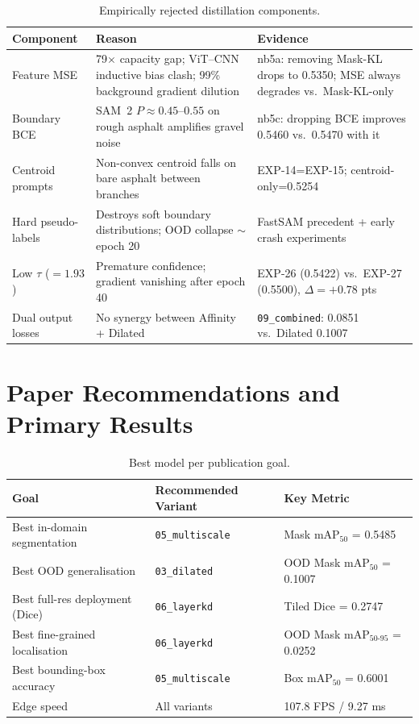 \documentclass[12pt,a4paper]{article}
\begin{document}
\begin{table}[H]\centering
\caption{Empirically rejected distillation components.}
\label{tab:rejected}
\begin{tabular}{p{2.8cm}p{5.8cm}p{4.8cm}}
\toprule
Component & Reason & Evidence \\
\midrule
Feature MSE &
  79$\times$ capacity gap; ViT--CNN inductive bias clash;
  99\% background gradient dilution &
  nb5a: removing Mask-KL drops to 0.5350;
  MSE always degrades vs.\ Mask-KL-only \\
\midrule
Boundary BCE &
  SAM~2 $P\approx0.45$--$0.55$ on rough asphalt amplifies gravel noise &
  nb5c: dropping BCE improves 0.5460 vs.\ 0.5470 with it \\
\midrule
Centroid prompts &
  Non-convex centroid falls on bare asphalt between branches &
  EXP-14=EXP-15; centroid-only=0.5254 \\
\midrule
Hard pseudo-labels &
  Destroys soft boundary distributions; OOD collapse $\sim$epoch 20 &
  FastSAM precedent + early crash experiments \\
\midrule
Low $\tau$ ($=1.93$) &
  Premature confidence; gradient vanishing after epoch 40 &
  EXP-26 (0.5422) vs.\ EXP-27 (0.5500), $\Delta=+0.78$ pts \\
\midrule
Dual output losses &
  No synergy between Affinity + Dilated &
  \texttt{09\_combined}: 0.0851 vs.\ Dilated 0.1007 \\
\bottomrule
\end{tabular}
\end{table}

\section{Paper Recommendations and Primary Results}
\label{sec:paper}

\begin{table}[H]\centering
\caption{Best model per publication goal.}
\begin{tabular}{lll}
\toprule
Goal & Recommended Variant & Key Metric \\
\midrule
Best in-domain segmentation & \texttt{05\_multiscale} & Mask mAP$_{50}$ = 0.5485 \\
Best OOD generalisation & \texttt{03\_dilated} & OOD Mask mAP$_{50}$ = 0.1007 \\
Best full-res deployment (Dice) & \texttt{06\_layerkd} & Tiled Dice = 0.2747 \\
Best fine-grained localisation & \texttt{06\_layerkd} & OOD Mask mAP$_{50\text{-}95}$ = 0.0252 \\
Best bounding-box accuracy & \texttt{05\_multiscale} & Box mAP$_{50}$ = 0.6001 \\
Edge speed & All variants & 107.8 FPS / 9.27 ms \\
\bottomrule
\end{tabular}
\end{table}
\end{document}
